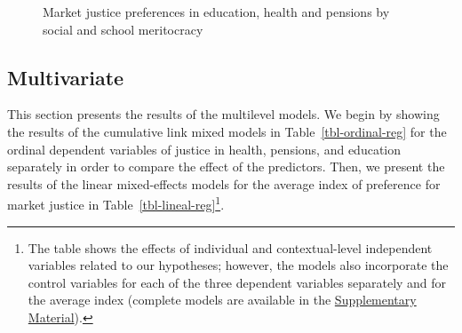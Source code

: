 \documentclass[
  12pt,
  letterpaper,
]{article}
\begin{document}
\begin{figure}


\caption{\label{fig-bivariate}Market justice preferences in education,
health and pensions by social and school meritocracy}

\end{figure}%

\subsection{Multivariate}\label{multivariate}

This section presents the results of the multilevel models. We begin by
showing the results of the cumulative link mixed models in
Table~\ref{tbl-ordinal-reg} for the ordinal dependent variables of
justice in health, pensions, and education separately in order to
compare the effect of the predictors. Then, we present the results of
the linear mixed-effects models for the average index of preference for
market justice in Table~\ref{tbl-lineal-reg}\footnote{The table shows
  the effects of individual and contextual-level independent variables
  related to our hypotheses; however, the models also incorporate the
  control variables for each of the three dependent variables separately
  and for the average index (complete models are available in the
  \hyperref[appendix]{Supplementary Material}).}.
\end{document}
